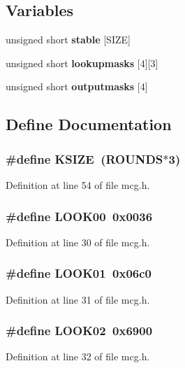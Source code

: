 \subsection*{Variables}
\begin{CompactItemize}
\item 
unsigned short {\bf stable} [SIZE]
\item 
unsigned short {\bf lookupmasks} [4][3]
\item 
unsigned short {\bf outputmasks} [4]
\end{CompactItemize}


\subsection{Define Documentation}
\subsubsection{\setlength{\rightskip}{0pt plus 5cm}\#define KSIZE\ (ROUNDS$\ast$3)}\label{mcg_8h_a18}




Definition at line 54 of file mcg.h.
\subsubsection{\setlength{\rightskip}{0pt plus 5cm}\#define LOOK00\ 0x0036}\label{mcg_8h_a1}




Definition at line 30 of file mcg.h.
\subsubsection{\setlength{\rightskip}{0pt plus 5cm}\#define LOOK01\ 0x06c0}\label{mcg_8h_a2}




Definition at line 31 of file mcg.h.
\subsubsection{\setlength{\rightskip}{0pt plus 5cm}\#define LOOK02\ 0x6900}\label{mcg_8h_a3}




Definition at line 32 of file mcg.h.

